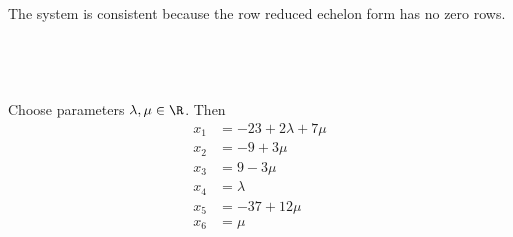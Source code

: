\documentclass[a4paper]{article}
\begin{document}
\subsection{~}

The system is consistent because the row reduced echelon form has no zero rows.

\subsection{~}

Choose parameters $\lambda, \mu \in \R$. Then \begin{align*}
x_1 &= -23 + 2\lambda + 7\mu\\
x_2 &= -9 + 3\mu\\
x_3 &= 9 - 3\mu\\
x_4 &= \lambda\\
x_5 &= -37 + 12\mu\\
x_6 &= \mu
\end{align*}
\end{document}
